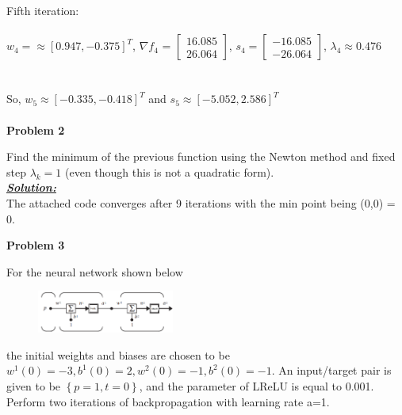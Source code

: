 \documentclass{article}
\begin{document}
\noindent Fifth iteration:\\\\ $w_4 = \approx [0.947, -0.375]^T$, \( \nabla f_4 \) = $ \begin{bmatrix} 
  16.085\\
  26.064 
\end{bmatrix}$, $ s_4 = \begin{bmatrix} 
  -16.085\\
  -26.064
\end{bmatrix}$, $\lambda_4 \approx 0.476$\\ \\ \\ So, $w_5 \approx [-0.335, -0.418]^T$ and $s_5 \approx [-5.052, 2.586]^T$ \\ \\

\newpage
\noindent \textbf{Problem 2}

\noindent Find the minimum of the previous function using the Newton method and fixed step $ \lambda_k = 1$ (even though this is not a quadratic form). \\

\noindent \underline{\textbf{\textit{Solution:}}} \\ 

\noindent The attached code converges after 9 iterations with the min point being (0,0) = 0.



\newpage
\noindent \textbf{Problem 3}

\noindent For the neural network shown below

\begin{figure}[h]
  \centering
  \includegraphics[width=0.4\textwidth]{pr3_a.png}
  
\end{figure}

\noindent the initial weights and biases are chosen to be $w^1(0) = -3, b^1(0) = 2, w^2(0) = -1, b^2(0) = -1$. An input/target pair is given to be ${\left \{p = 1, t=0 \right \} }$, and the parameter of LReLU is equal to 0.001. Perform two iterations of backpropagation with learning rate a=1.  \\ \\ \\
\end{document}
